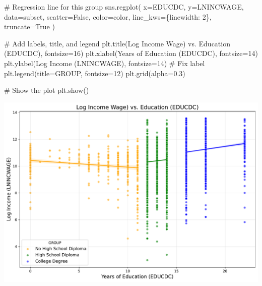 \documentclass[
  11pt,
  letterpaper,
  DIV=11,
  numbers=noendperiod]{scrartcl}
\newenvironment{Shaded}{\begin{snugshade}}{\end{snugshade}}
\newcommand{\CommentTok}[1]{\textcolor[rgb]{0.37,0.37,0.37}{#1}}
\newcommand{\DecValTok}[1]{\textcolor[rgb]{0.68,0.00,0.00}{#1}}
\newcommand{\FloatTok}[1]{\textcolor[rgb]{0.68,0.00,0.00}{#1}}
\newcommand{\NormalTok}[1]{\textcolor[rgb]{0.00,0.23,0.31}{#1}}
\newcommand{\OperatorTok}[1]{\textcolor[rgb]{0.37,0.37,0.37}{#1}}
\newcommand{\StringTok}[1]{\textcolor[rgb]{0.13,0.47,0.30}{#1}}
\newcommand{\VariableTok}[1]{\textcolor[rgb]{0.07,0.07,0.07}{#1}}
\begin{document}
\begin{Shaded}
\begin{Highlighting}[]
    \CommentTok{\# Regression line for this group}
\NormalTok{    sns.regplot(}
\NormalTok{        x}\OperatorTok{=}\StringTok{\textquotesingle{}EDUCDC\textquotesingle{}}\NormalTok{, }
\NormalTok{        y}\OperatorTok{=}\StringTok{\textquotesingle{}LNINCWAGE\textquotesingle{}}\NormalTok{,  }
\NormalTok{        data}\OperatorTok{=}\NormalTok{subset, }
\NormalTok{        scatter}\OperatorTok{=}\VariableTok{False}\NormalTok{, }
\NormalTok{        color}\OperatorTok{=}\NormalTok{color, }
\NormalTok{        line\_kws}\OperatorTok{=}\NormalTok{\{}\StringTok{\textquotesingle{}linewidth\textquotesingle{}}\NormalTok{: }\DecValTok{2}\NormalTok{\},}
\NormalTok{        truncate}\OperatorTok{=}\VariableTok{True}
\NormalTok{    )}

\CommentTok{\# Add labels, title, and legend}
\NormalTok{plt.title(}\StringTok{\textquotesingle{}Log Income Wage) vs. Education (EDUCDC)\textquotesingle{}}\NormalTok{, fontsize}\OperatorTok{=}\DecValTok{16}\NormalTok{)}
\NormalTok{plt.xlabel(}\StringTok{\textquotesingle{}Years of Education (EDUCDC)\textquotesingle{}}\NormalTok{, fontsize}\OperatorTok{=}\DecValTok{14}\NormalTok{)}
\NormalTok{plt.ylabel(}\StringTok{\textquotesingle{}Log Income (LNINCWAGE)\textquotesingle{}}\NormalTok{, fontsize}\OperatorTok{=}\DecValTok{14}\NormalTok{)  }\CommentTok{\# Fix label}
\NormalTok{plt.legend(title}\OperatorTok{=}\StringTok{\textquotesingle{}GROUP\textquotesingle{}}\NormalTok{, fontsize}\OperatorTok{=}\DecValTok{12}\NormalTok{)}
\NormalTok{plt.grid(alpha}\OperatorTok{=}\FloatTok{0.3}\NormalTok{)}

\CommentTok{\# Show the plot}
\NormalTok{plt.show()}
\end{Highlighting}
\end{Shaded}

\includegraphics{mp1_files/figure-pdf/cell-26-output-1.pdf}
\end{document}
